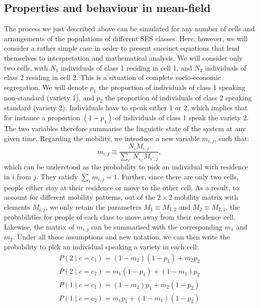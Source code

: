 \documentclass[../thesis.tex]{subfiles}
\begin{document}
\subsection{Properties and behaviour in mean-field}
The process we just described above can be simulated for any number of cells and
arrangements of the populations of different \ac{SES} classes. Here, however, we will
consider a rather simple case in order to present succinct equations that lend
themselves to interpretation and mathematical analysis. We will consider only two cells,
with $N_1$ individuals of class 1 residing in cell 1, and $N_2$ individuals of class 2
residing in cell 2. This is a situation of complete socio-economic segregation. We will
denote $p_1$ the proportion of individuals of class 1 speaking non-standard (variety 1),
and $p_2$ the proportion of individuals of class 2 speaking standard (variety 2).
Individuals have to speak either 1 or 2, which implies that for instance a proportion
$(1 - p_1)$ of individuals of class 1 speak the variety 2. The two variables therefore
summarise the linguistic state of the system at any given time. Regarding the mobility,
we introduce a new variable $m_{i, j}$, such that:
\begin{equation}
  m_{i, j} \equiv \frac{N_{i} M_{i, j}}{\sum_{i'} N_{s_{i'}} M_{i', j}},
\end{equation}
which can be understood as the probability to pick an individual with residence in $i$
from $j$. They satisfy $\sum_i m_{i, j} = 1$. Further, since there are only two cells,
people either stay at their residence or move to the other cell. As a result, to account
for different mobility patterns, out of the $2 \times 2$ mobility matrix with elements
$M_{i, j}$, we only retain the parameters $M_1 \equiv M_{1, 2}$ and $M_2 \equiv M_{2,
1}$, the probabilities for people of each class to move away from their residence cell.
Likewise, the matrix of $m_{i, j}$ can be summarised with the corresponding $m_1$ and
$m_2$. Under all these assumptions and new notation, we can then write the probability
to pick an individual speaking a variety in each cell:
\begin{equation}
  \label{eq:prev_step_mob}
  \begin{aligned}
      P(2 \mid c = c_1)
          = (1 - m_2) (1 - p_1) + m_2 p_2
      \\
      P(2 \mid c = c_2)
          = m_1 (1 - p_1) + (1 - m_1) p_2
      \\
      P(1 \mid c = c_1)
          = (1 - m_2) p_1 + m_2 (1 - p_2)
      \\
      P(1 \mid c = c_2)
          = m_1 p_1 + (1 - m_1) (1 - p_2)
  \end{aligned}
\end{equation}
\end{document}

